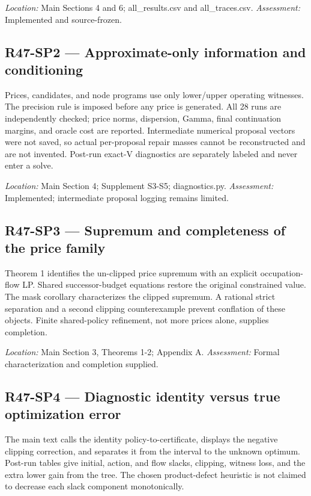 \noindent\emph{Location:} Main Sections 4 and 6; all\_results.csv and all\_traces.csv. \emph{Assessment:} Implemented and source-frozen.

\subsection{R47-SP2 --- Approximate-only information and conditioning}
Prices, candidates, and node programs use only lower/upper operating witnesses. The precision rule is imposed before any price is generated. All 28 runs are independently checked; price norms, dispersion, Gamma, final continuation margins, and oracle cost are reported. Intermediate numerical proposal vectors were not saved, so actual per-proposal repair masses cannot be reconstructed and are not invented. Post-run exact-V diagnostics are separately labeled and never enter a solve.

\noindent\emph{Location:} Main Section 4; Supplement S3-S5; diagnostics.py. \emph{Assessment:} Implemented; intermediate proposal logging remains limited.

\subsection{R47-SP3 --- Supremum and completeness of the price family}
Theorem 1 identifies the un-clipped price supremum with an explicit occupation-flow LP. Shared successor-budget equations restore the original constrained value. The mask corollary characterizes the clipped supremum. A rational strict separation and a second clipping counterexample prevent conflation of these objects. Finite shared-policy refinement, not more prices alone, supplies completion.

\noindent\emph{Location:} Main Section 3, Theorems 1-2; Appendix A. \emph{Assessment:} Formal characterization and completion supplied.

\subsection{R47-SP4 --- Diagnostic identity versus true optimization error}
The main text calls the identity policy-to-certificate, displays the negative clipping correction, and separates it from the interval to the unknown optimum. Post-run tables give initial, action, and flow slacks, clipping, witness loss, and the extra lower gain from the tree. The chosen product-defect heuristic is not claimed to decrease each slack component monotonically.

